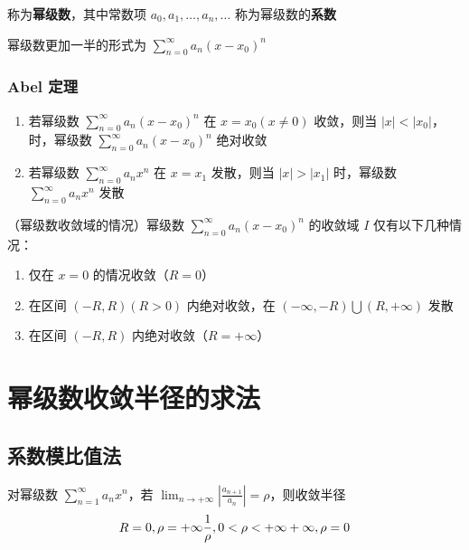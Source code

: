 \documentclass[lang = zh , final , oneside , openany , titlepage , zihao = -4 , linespread = 1.3 , baselineskip = false , cjk-font = windows , text-font = newtx , math-font = newtx , math-style = ISO , uppercase-greek = upright , integral-limits = false]{sjtureport}
\begin{document}
称为\textbf{幂级数}，其中常数项 \(a_0,a_1,\ldots,a_n,\ldots\)
称为幂级数的\textbf{系数}

幂级数更加一半的形式为 \(\displaystyle \sum_{n=0}^\infty a_n(x-x_0)^n\)

\subsubsection{Abel 定理}

\begin{enumerate}
\item
  若幂级数 \(\displaystyle \sum_{n=0}^\infty a_n(x-x_0)^n\) 在
  \(x=x_0(x\neq 0)\) 收敛，则当
  \(\vert x \vert <\vert x_0\vert\)，时，幂级数
  \(\displaystyle \sum_{n=0}^\infty a_n(x-x_0)^n\) 绝对收敛
\item
  若幂级数 \(\displaystyle \sum_{n=0}^\infty a_nx^n\) 在 \(x=x_1\)
  发散，则当 \(\vert x \vert >\vert x_1\vert\) 时，幂级数
  \(\displaystyle \sum_{n=0}^\infty a_nx^n\) 发散
\end{enumerate}

\begin{lemma}
    （幂级数收敛域的情况）幂级数 \(\displaystyle \sum_{n=0}^\infty a_n(x-x_0)^n\) 的收敛域 \(I\)
仅有以下几种情况：

\begin{enumerate}
\def\labelenumi{\arabic{enumi}.}
\item
  仅在 \(x=0\) 的情况收敛（\(R=0\)）
\item
  在区间 \((-R,R)(R>0)\) 内绝对收敛，在
  \((-\infty ,-R)\bigcup(R,+\infty)\) 发散
\item
  在区间 \((-R,R)\) 内绝对收敛（\(R=+\infty\)）
\end{enumerate}
\end{lemma}

\section{幂级数收敛半径的求法}

\subsection{系数模比值法}

\begin{theorem}
    对幂级数 \(\displaystyle \sum_{n=1}^\infty a_nx^n\)，若
\(\displaystyle \lim_{n\to+\infty}\left\vert\frac{a_{n+1}}{a_n}\right\vert = \rho\)，则收敛半径
\[\displaystyle R=\begin{aligned}0,\rho=+\infty\newline  \frac{1}{\rho}, 0<\rho<+\infty\newline +\infty ,\rho=0\end{aligned}\]
\end{theorem}
\end{document}
